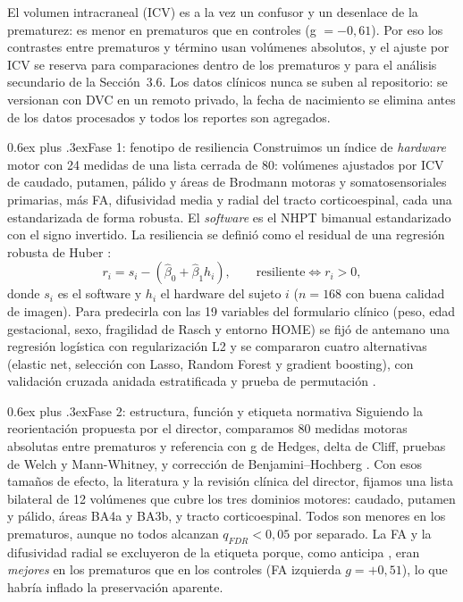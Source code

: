 \documentclass[conference,letterpaper,10pt]{IEEEtran}
\makeatletter
\def\subsection{\@startsection{subsection}{2}{\z@}{1.5ex plus 1ex minus .5ex}%
  {0.6ex plus .3ex}{\normalfont\normalsize\bfseries}}
\makeatother
\begin{document}
El volumen intracraneal (ICV) es a la vez un confusor y un desenlace de la prematurez: es menor en prematuros que en controles (g $=-0{,}61$). Por eso los contrastes entre prematuros y término usan volúmenes absolutos, y el ajuste por ICV se reserva para comparaciones dentro de los prematuros y para el análisis secundario de la Sección~3.6. Los datos clínicos nunca se suben al repositorio: se versionan con DVC en un remoto privado, la fecha de nacimiento se elimina antes de los datos procesados y todos los reportes son agregados.

\subsection{Fase 1: fenotipo de resiliencia}
Construimos un índice de \emph{hardware} motor con 24 medidas de una lista cerrada de 80: volúmenes ajustados por ICV de caudado, putamen, pálido y áreas de Brodmann motoras y somatosensoriales primarias, más FA, difusividad media y radial del tracto corticoespinal, cada una estandarizada de forma robusta. El \emph{software} es el NHPT bimanual estandarizado con el signo invertido. La resiliencia se definió como el residual de una regresión robusta de Huber \cite{huber1964}:
\begin{equation}
r_i = s_i - (\hat\beta_0 + \hat\beta_1 h_i), \qquad \text{resiliente} \iff r_i > 0,
\label{eq:residual}
\end{equation}
donde $s_i$ es el software y $h_i$ el hardware del sujeto $i$ ($n=168$ con buena calidad de imagen). Para predecirla con las 19 variables del formulario clínico (peso, edad gestacional, sexo, fragilidad de Rasch y entorno HOME) se fijó de antemano una regresión logística con regularización L2 y se compararon cuatro alternativas (elastic net, selección con Lasso, Random Forest y gradient boosting), con validación cruzada anidada estratificada \cite{varma2006} y prueba de permutación \cite{ojala2010}.

\subsection{Fase 2: estructura, función y etiqueta normativa}
Siguiendo la reorientación propuesta por el director, comparamos 80 medidas motoras absolutas entre prematuros y referencia con g de Hedges, delta de Cliff, pruebas de Welch y Mann-Whitney, y corrección de Benjamini--Hochberg \cite{benjamini1995}. Con esos tamaños de efecto, la literatura \cite{volpe2009,charpak2017,wilson2017} y la revisión clínica del director, fijamos una lista bilateral de 12 volúmenes que cubre los tres dominios motores: caudado, putamen y pálido, áreas BA4a y BA3b, y tracto corticoespinal. Todos son menores en los prematuros, aunque no todos alcanzan $q_{FDR}<0{,}05$ por separado. La FA y la difusividad radial se excluyeron de la etiqueta porque, como anticipa \cite{groeschel2014}, eran \emph{mejores} en los prematuros que en los controles (FA izquierda $g=+0{,}51$), lo que habría inflado la preservación aparente.
\end{document}
